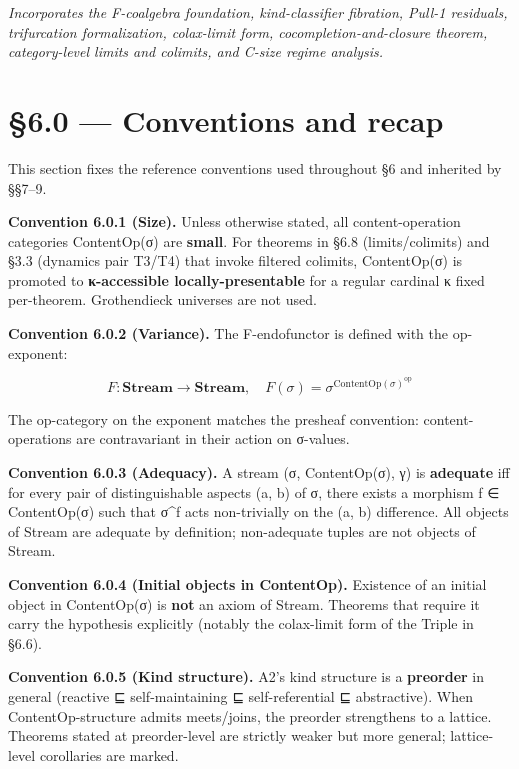 \documentclass[11pt, openany]{book}
\newcommand{\sectionbreak}{\clearpage}
\begin{document}
\textit{Incorporates the F-coalgebra foundation, kind-classifier fibration, Pull-1 residuals, trifurcation formalization, colax-limit form, cocompletion-and-closure theorem, category-level limits and colimits, and C-size regime analysis.}

\sectionbreak

\section{§6.0 --- Conventions and recap}

This section fixes the reference conventions used throughout §6 and inherited by §§7–9.

\textbf{Convention 6.0.1 (Size).} Unless otherwise stated, all content-operation categories ContentOp(σ) are \textbf{small}. For theorems in §6.8 (limits/colimits) and §3.3 (dynamics pair T3/T4) that invoke filtered colimits, ContentOp(σ) is promoted to \textbf{κ-accessible locally-presentable} for a regular cardinal κ fixed per-theorem. Grothendieck universes are not used.

\textbf{Convention 6.0.2 (Variance).} The F-endofunctor is defined with the op-exponent:

\[
F : \mathbf{Stream} \to \mathbf{Stream}, \quad F(\sigma) = \sigma^{\mathrm{ContentOp}(\sigma)^{\mathrm{op}}}
\]

The op-category on the exponent matches the presheaf convention: content-operations are contravariant in their action on σ-values.

\textbf{Convention 6.0.3 (Adequacy).} A stream (σ, ContentOp(σ), γ) is \textbf{adequate} iff for every pair of distinguishable aspects (a, b) of σ, there exists a morphism f ∈ ContentOp(σ) such that σ\textasciicircum{}f acts non-trivially on the (a, b) difference. All objects of Stream are adequate by definition; non-adequate tuples are not objects of Stream.

\textbf{Convention 6.0.4 (Initial objects in ContentOp).} Existence of an initial object in ContentOp(σ) is \textbf{not} an axiom of Stream. Theorems that require it carry the hypothesis explicitly (notably the colax-limit form of the Triple in §6.6).

\textbf{Convention 6.0.5 (Kind structure).} A2's kind structure is a \textbf{preorder} in general (reactive ⊑ self-maintaining ⊑ self-referential ⊑ abstractive). When ContentOp-structure admits meets/joins, the preorder strengthens to a lattice. Theorems stated at preorder-level are strictly weaker but more general; lattice-level corollaries are marked.
\end{document}
